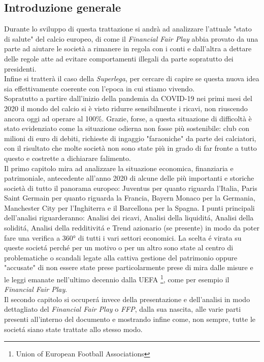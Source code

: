 \documentclass[
    corpo=12pt,
    oneside,
    evenboxes,
    tipotesi=triennale,
    stile=classica,
    oldstyle,
    autoretitolo,
    greek,
]{toptesi}
\begin{document}
\begin{interlinea}{1.5}
\chapter{Introduzione generale}
Durante lo sviluppo di questa trattazione si andrà ad analizzare l'attuale "stato di salute"
del calcio europeo, di come il \emph{Financial Fair Play} abbia provato da una parte ad aiutare le società a rimanere in regola con i conti e 
dall'altra a dettare delle regole atte ad evitare comportamenti illegali da parte sopratutto dei presidenti.\\
Infine si tratterà il caso della \emph{Superlega}, per cercare di capire se questa nuova idea sia effettivamente coerente con l'epoca in cui stiamo vivendo.\\
Sopratutto a partire dall'inizio della pandemia da COVID-19 nei primi mesi del 2020 il mondo del calcio si è visto ridurre sensibilmente i ricavi, non riuscendo 
ancora oggi ad operare al 100\%. Grazie, forse, a questa situazione di difficoltà è stato evidenziato come la situazione odierna non fosse più sostenibile: 
club con milioni di euro di debiti, richieste di ingaggio "faraoniche" da parte dei calciatori, con il risultato che molte societ\`a non sono state pi\`u in grado di far fronte 
a tutto questo e costrette a dichiarare falimento.\\
Il primo capitolo mira ad analizzare la situazione economica, finanziaria e patrimoniale, antecedente all'anno 2020 di alcune delle più 
importanti e storiche societ\`a di tutto il panorama europeo: Juventus per quanto riguarda l'Italia, Paris Saint Germain per quanto riguarda la 
Francia, Bayern Monaco per la Germania, Manchester City per l'Inghiterra e il Barcellona per la Spagna. I punti principali dell'analisi riguarderanno: 
Analisi dei ricavi, Analisi della liquidit\'a, Analisi della solidit\'a, Analisi della redditivit\'a e Trend azionario (se presente) in modo da 
poter fare una verifica a 360° di tutti i vari settori economici. La scelta \'e virata su queste societ\'a perch\'e per un motivo o per un altro sono state 
al centro di problematiche o scandali legate alla cattiva gestione del patrimonio oppure "accusate" di non essere state prese particolarmente prese di mira dalle misure e le leggi 
emanate nell'ultimo decennio dalla UEFA \footnote{ Union of European Football Associations}, come per esempio il \emph{Financial Fair Play}.\\
Il secondo capitolo si occuper\'a invece della presentazione e dell'analisi in modo dettagliato del \emph{Financial Fair Play} o 
\emph{FFP}, dalla sua nascita, alle varie parti presenti all'interno del documento e mostrando infine come, non sempre, tutte le societ\'a siano state trattate allo stesso modo.\\

\end{interlinea}
\end{document}
